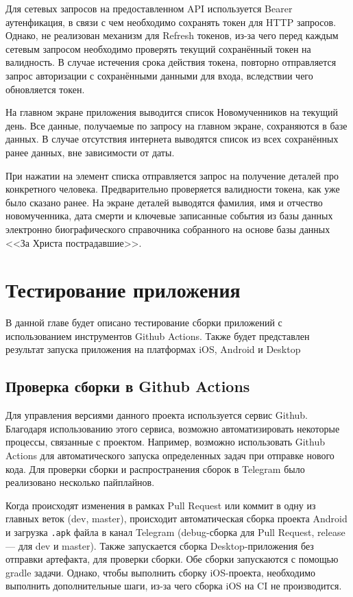 \documentclass[14pt, russian]{scrartcl}
\begin{document}
Для сетевых запросов на предоставленном API используется Bearer аутенфикация, в связи с чем необходимо сохранять токен для HTTP запросов. Однако, не реализован механизм для Refresh токенов, из-за чего перед каждым сетевым запросом необходимо проверять текущий сохранённый токен на валидность. В случае истечения срока действия токена, повторно отправляется запрос авторизации с сохранёнными данными для входа, вследствии чего обновляется токен.

На главном экране приложения выводится список Новомученников на текущий день. Все данные, получаемые по запросу на главном экране, сохраняются в базе данных. В случае отсутствия интернета выводятся список из всех сохранённых ранее данных, вне зависимости от даты.

При нажатии на элемент списка отправляется запрос на получение деталей про конкретного человека. Предварительно проверяется валидности токена, как уже было сказано ранее. На экране деталей выводятся фамилия, имя и отчество новомученника, дата смерти и ключевые записанные события из базы данных электронно биографического справочника собранного на основе базы данных <<За Христа пострадавшие>>.

\section{Тестирование приложения}\label{sect:testing}

В данной главе будет описано тестирование сборки приложений с использованием инструментов Github Actions. Также будет представлен результат запуска приложения на платформах iOS, Android и Desktop

\subsection{Проверка сборки в Github Actions}

Для управления версиями данного проекта используется сервис Github. Благодаря использованию этого сервиса, возможно автоматизировать некоторые процессы, связанные с проектом. Например, возможно использовать Github Actions для автоматического запуска определенных задач при отправке нового кода. Для проверки сборки и распространения сборок в Telegram было реализовано несколько пайплайнов.

Когда происходят изменения в рамках Pull Request или коммит в одну из главных веток (dev, master), происходит автоматическая сборка проекта Android и загрузка \texttt{.apk} файла в канал Telegram (debug-сборка для Pull Request, release --- для dev и master). Также запускается сборка Desktop-приложения без отправки артефакта, для проверки сборки. Обе сборки запускаются с помощью gradle задачи. Однако, чтобы выполнить сборку iOS-проекта, необходимо выполнить дополнительные шаги, из-за чего сборка iOS на CI не производится.
\end{document}
